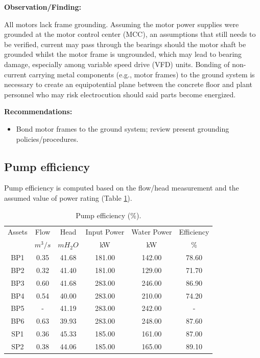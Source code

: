 \textbf{Observation/Finding:}

All motors lack frame grounding. Assuming the motor power supplies were grounded at the motor control center (MCC), an assumptions that still needs to be verified, current may pass through the bearings should the motor shaft be grounded whilst the motor frame is ungrounded, which may lead to bearing damage, especially among variable speed drive (VFD) units. Bonding of non-current carrying metal components (e.g., motor frames) to the ground system is necessary to create an equipotential plane between the concrete floor and plant personnel who may risk electrocution should said parts become energized.

\textbf{Recommendations: }
\begin{itemize}
	\item Bond motor frames to the ground system; review present grounding policies/procedures. 
\end{itemize}

\subsection{Pump efficiency} \label{ch05mech03}
Pump efficiency is computed based on the flow/head measurement and the assumed value of power rating (Table \ref{ch05_tbl_efficiency}). 
\begin{table}[!h]
	\caption{Pump efficiency (\%).}
	\label{ch05_tbl_efficiency}
	{\footnotesize
\begin{tabular}{c|c|c|c|c|c}
	\hline
	Assets & Flow & Head & Input Power & Water Power & Efficiency \\ 
	& $m^3/s$ & $mH_2O$ & kW & kW & \% \\ 
	\hline
	BP1 & 0.35 & 41.68 & 181.00 & 142.00 & 78.60 \\ 
	BP2 & 0.32 & 41.40 & 181.00 & 129.00 & 71.70 \\ 
	BP3 & 0.60 & 41.68 & 283.00 & 246.00 & 86.90 \\ 
	BP4 & 0.54 & 40.00 & 283.00 & 210.00 & 74.20 \\ 
	BP5 & - & 41.19 & 283.00 & 242.00 & - \\ 
	BP6 & 0.63 & 39.93 & 283.00 & 248.00 & 87.60 \\ 
	SP1 & 0.36 & 45.33 & 185.00 & 161.00 & 87.00 \\ 
	SP2 & 0.38 & 44.06 & 185.00 & 165.00 & 89.10 \\ 
	\hline
\end{tabular}
	}
\end{table}


